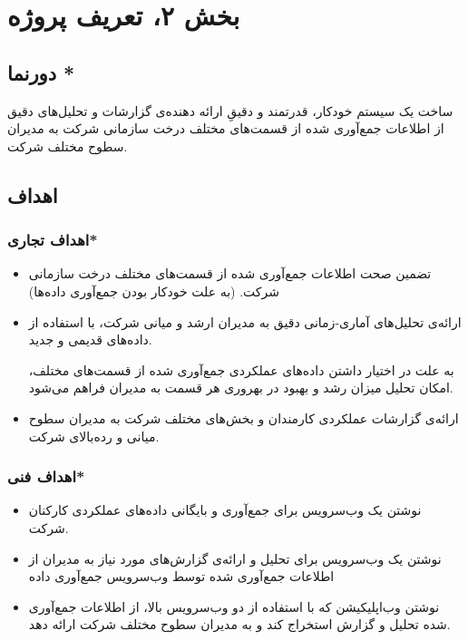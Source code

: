 \chapter{بخش ۲، تعریف پروژه\\}
\section{دورنما *}
ساخت یک سیستم خودکار، قدرتمند و دقیقِ ارائه دهنده‌ی گزارشات و تحلیل‌های دقیق از اطلاعات جمع‌آوری شده از قسمت‌های مختلف درخت سازمانی شرکت  به مدیران سطوح مختلف شرکت.

\section{اهداف }
\subsection{اهداف تجاری*}
\begin{itemize}
\item 
تضمین صحت اطلاعات جمع‌آوری شده از قسمت‌های مختلف درخت سازمانی شرکت. (به علت خودکار بودن جمع‌آوری داده‌ها)
\item 
ارائه‌ی تحلیل‌های آماری-زمانی دقیق به مدیران ارشد و میانی شرکت، با استفاده از داده‌های قدیمی و جدید.

به علت در اختیار‌ داشتن داده‌های عملکردی جمع‌آوری شده از قسمت‌های مختلف، امکان تحلیل میزان رشد و بهبود در بهروری هر قسمت به مدیران فراهم می‌شود.
\item 
ارائه‌ی گزارشات عملکردی کارمندان و بخش‌های مختلف شرکت به مدیران سطوح میانی و رده‌بالای شرکت.
\end{itemize}
\subsection{اهداف فنی*}\label{tech-objective}
\begin{itemize}
\item
نوشتن یک وب‌سرویس برای جمع‌آوری و بایگانی داده‌های عملکردی کارکنان شرکت.
\item 
نوشتن یک وب‌سرویس برای تحلیل‌ و ارائه‌ی گزار‌ش‌های مورد نیاز به مدیران از اطلاعات جمع‌آوری شده توسط وب‌سرویس جمع‌آوری داده
\item 
نوشتن وب‌اپلیکیشن 
که با استفاده از دو وب‌سرویس بالا، از اطلاعات جمع‌آوری شده تحلیل و گزارش استخراج کند و به مدیران سطوح مختلف شرکت ارائه دهد.
\end{itemize}

